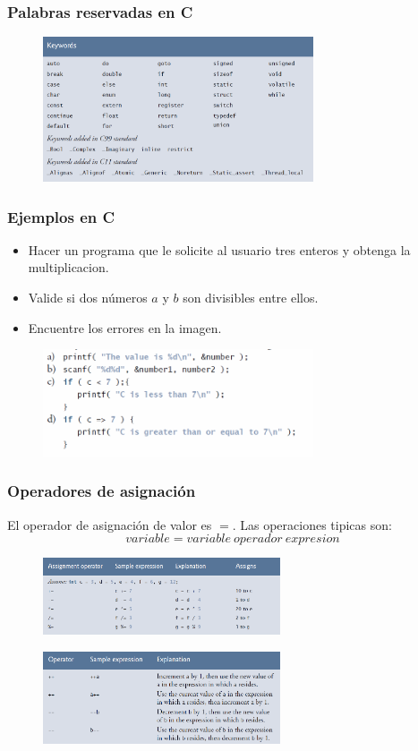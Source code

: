 \documentclass[10.5pt,scale=1.0,t,aspectratio=169,hyperref={pdfpagelabels=false}]{beamer}
\begin{document}
\begin{frame}
	\frametitle{Palabras reservadas en C}
	\begin{figure}
		\centering
		\includegraphics[width=8cm]{KeywordsC}
	\end{figure}
	
\end{frame}
\begin{frame}
	\frametitle{Ejemplos en C}
	\begin{itemize}
		\item Hacer un programa que le solicite al usuario tres enteros y obtenga la multiplicacion.
		\item Valide si dos números $a$ y $b$ son divisibles entre ellos.
		\item Encuentre los errores en la imagen.
	\end{itemize}
	\begin{figure}
		\centering
		\includegraphics[width=8cm]{ErrorEjemplo}
	\end{figure}
\end{frame}

\begin{frame}
	\frametitle{Operadores de asignación}
	El operador de asignación de valor es $=$. Las operaciones tipicas son:
	\[
		variable = variable \ operador \ expresion
	\]
	\begin{figure}
		\centering
		\includegraphics[width=7cm]{Operaciones}
	\end{figure}
	\begin{figure}
		\centering
		\includegraphics[width=7cm]{IncrementoDecremento}
	\end{figure}
\end{frame}
\end{document}
